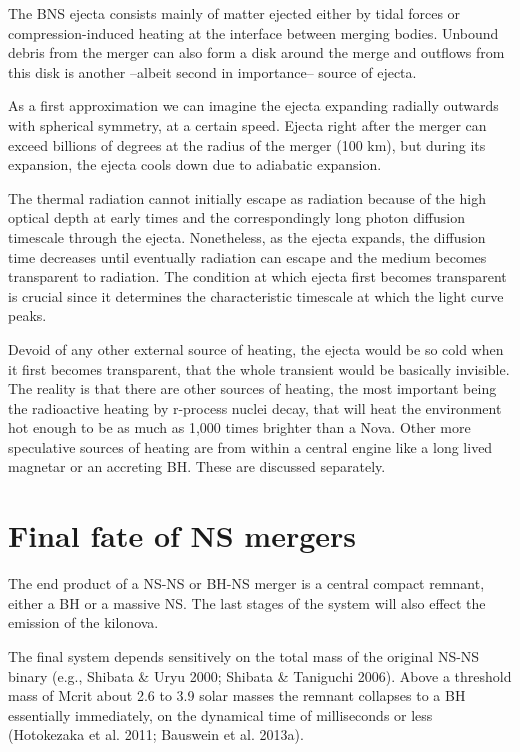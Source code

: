 The BNS ejecta consists mainly of matter ejected either by tidal forces or compression-induced heating at the interface between merging bodies. 
Unbound debris from the merger can also form a disk around the merge and outflows from this disk is another --albeit second in importance-- source of ejecta.

As a first approximation we can imagine the ejecta expanding radially outwards with spherical symmetry, at a certain speed.
Ejecta right after the merger can exceed billions of degrees at the radius of the merger (100 km), but 
during its expansion, the ejecta cools down due to adiabatic expansion.

The thermal radiation cannot initially escape as radiation because of the high optical depth at early times and the correspondingly long photon diffusion timescale through the ejecta. 
Nonetheless, as the ejecta expands, the diffusion time decreases until eventually radiation can escape and the medium becomes transparent to radiation.
The condition at which ejecta first becomes transparent is crucial since it determines the characteristic timescale at which the light curve peaks.

Devoid of any other external source of heating, the ejecta would be so cold when it first becomes transparent, that the whole transient would be basically invisible.
The reality is that there are other sources of heating, the most important being the radioactive heating by r-process nuclei decay, that will heat the environment hot enough to be as much as 1,000 times brighter than a Nova.
Other more speculative sources of heating are from within a central engine like a long lived magnetar or an accreting BH. These are discussed separately.


\section{Final fate of NS mergers}

The end product of a NS-NS or BH-NS merger is a central compact remnant, either a BH or a massive NS. 
The last stages of the system will also effect the emission of the kilonova.

The final system depends sensitively on the total mass of the original NS-NS binary (e.g., Shibata \& Uryu 2000; Shibata \& Taniguchi 2006). Above a threshold mass of Mcrit about 2.6 to 3.9 solar masses the remnant collapses to a BH essentially immediately, on the dynamical time of milliseconds or less (Hotokezaka et al. 2011; Bauswein et al. 2013a).

